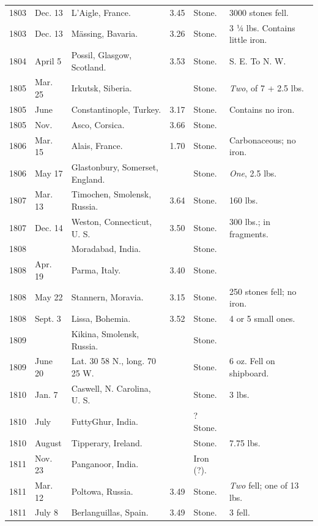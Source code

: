 \documentclass[a4paper, 12pt, oneside]{article}
\begin{document}
\begin{center}
\begin{longtable}{|p{10mm}|p{15mm}|p{32mm}|p{13mm}|p{13mm}|p{26mm}|}
        1803 & Dec. 13 & L’Aigle, France. & 3.45 & Stone. & 3000 stones fell. \\
        1803 & Dec. 13 & Mässing, Bavaria. & 3.26 & Stone. & 3 ¼ lbs. Contains little iron. \\
        1804 & April 5 & Possil, Glasgow, Scotland. & 3.53 & Stone. & S. E. To N. W. \\
        1805 & Mar. 25 & Irkutsk, Siberia. & ~ & Stone. & \emph{Two}, of 7 + 2.5 lbs. \\
        1805 & June & Constantinople, Turkey. & 3.17 & Stone. & Contains no iron. \\
        1805 & Nov. & Asco, Corsica. & 3.66 & Stone. & ~ \\
        1806 & Mar. 15 & Alais, France. & 1.70 & Stone. & Carbonaceous; no iron. \\
        1806 & May 17 & Glastonbury, Somerset, England. & ~ & Stone. & \emph{One}, 2.5 lbs. \\
        1807 & Mar. 13 & Timochen, Smolensk, Russia. & 3.64 & Stone. & 160 lbs. \\
        1807 & Dec. 14 & Weston, Connecticut, U. S. & 3.50 & Stone. & 300 lbs.; in fragments. \\
        1808 & ~ & Moradabad, India. & ~ & Stone. & ~ \\
        1808 & Apr. 19 & Parma, Italy. & 3.40 & Stone. & ~ \\
        1808 & May 22 & Stannern, Moravia. & 3.15 & Stone. & 250 stones fell; no iron. \\
        1808 & Sept. 3 & Lissa, Bohemia. & 3.52 & Stone. & 4 or 5 small ones. \\
        1809 & ~ & Kikina, Smolensk, Russia. & ~ & Stone. & ~ \\
        1809 & June 20 & Lat. 30 58 N., long. 70 25 W. & ~ & Stone. & 6 oz. Fell on ship\-board. \\
        1810 & Jan. 7 & Caswell, N. Carolina, U. S. & ~ & Stone. & 3 lbs. \\
        1810 & July & Futty\-Ghur, India. & ~ & ? Stone. & ~ \\
        1810 & August & Tipperary, Ireland. & ~ & Stone. & 7.75 lbs. \\
        1811 & Nov. 23 & Panganoor, India. & ~ & Iron (?). & ~ \\
        1811 & Mar. 12 & Poltowa, Russia. & 3.49 & Stone. & \emph{Two} fell; one of 13 lbs. \\
        1811 & July 8 & Berlanguillas, Spain. & 3.49 & Stone. & 3 fell. \\

\end{longtable}
\end{center}
\end{document}

